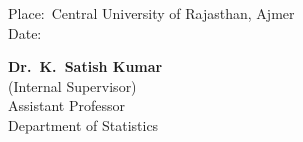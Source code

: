 \vspace{15mm}

\noindent
Place:\ Central University of Rajasthan, Ajmer\\
Date:

\vspace{15mm}

\hfill
\begin{minipage}[t]{0.55\textwidth}
\raggedleft
\textbf{Dr.\ K.\ Satish Kumar}\\
(Internal Supervisor)\\
Assistant Professor\\
Department of Statistics
\end{minipage}

\clearpage
